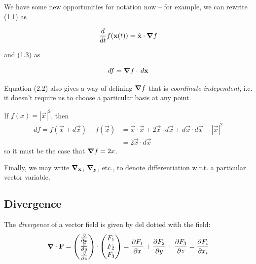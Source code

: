 \documentclass{../../template/note}
\begin{document}
    We have some new opportunities for notation now -- for example, we can rewrite (1.1) as

    \begin{proposition}
        \label{2.1} \[
            \frac{d}{dt} f(\vec x(t)) = \dot{\vec x} \cdot \grad f
        \]
    \end{proposition}
    
    and (1.3) as

    \begin{proposition}
        \label{2.2} \[
            df = \grad f \cdot \D{\V x}
        \]
    \end{proposition}
    
    
    
    Equation (2.2) also gives a way of defining \(\grad f\) that is \emph{coordinate-independent}, i.e. it doesn't require us to choose a particular basis at any point.
    
    
    \begin{example*}
        If \(f(x) = |\vec x|^2\), then
        \begin{align*}
            df = f(\vec x + d\vec x) - f(\vec x) &= \vec x \cdot \vec x + 2 \vec x \cdot d \vec x + d \vec x \cdot d \vec x - |\vec x|^2 \\
            &= 2\vec x \cdot d \vec x
        \end{align*}
        so it must be the case that \(\grad f = 2x\).        
    \end{example*}
    
    Finally, we may write \(\grad_{\vec x}\), \(\grad_{\vec y}\), etc., to denote differentiation w.r.t. a particular vector variable.
    
    \subsection{Divergence}

    \begin{definition*}
        The \emph{divergence} of a vector field is given by del dotted with the field:
        \begin{align*}
            \div \vec F = \begin{pmatrix}
             \pd{}{x} \\
             \pd{}{y} \\
             \pd{}{z} \\
            \end{pmatrix} \cdot \begin{pmatrix}
             F_1 \\
             F_2 \\
             F_3 \\
            \end{pmatrix} = \pd{F_1}{x} + \pd{F_2}{y} + \pd{F_3}{z} = \pd{F_i}{x_i}
        \end{align*}        
    \end{definition*}
\end{document}
